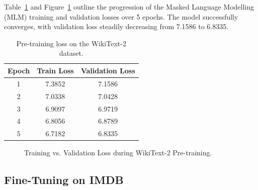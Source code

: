 \documentclass[11pt,a4paper]{article}
\theoremstyle{definition}
\begin{document}
Table~\ref{tab:pretrain_loss} and Figure~\ref{fig:pretrain_loss} outline the progression of the Masked Language Modelling (MLM) training and validation losses over 5 epochs. The model successfully converges, with validation loss steadily decreasing from 7.1586 to 6.8335.

\begin{table}[H]
\centering
\caption{Pre-training loss on the WikiText-2 dataset.}
\label{tab:pretrain_loss}
\begin{tabular}{ccc}
\toprule
\textbf{Epoch} & \textbf{Train Loss} & \textbf{Validation Loss} \\
\midrule
1 & 7.3852 & 7.1586 \\
2 & 7.0338 & 7.0428 \\
3 & 6.9097 & 6.9719 \\
4 & 6.8056 & 6.8789 \\
5 & 6.7182 & 6.8335 \\
\bottomrule
\end{tabular}
\end{table}

\begin{figure}[H]
\centering
{}
\caption{Training vs. Validation Loss during WikiText-2 Pre-training.}
\label{fig:pretrain_loss}
\end{figure}

\subsection{Fine-Tuning on IMDB}
\end{document}
